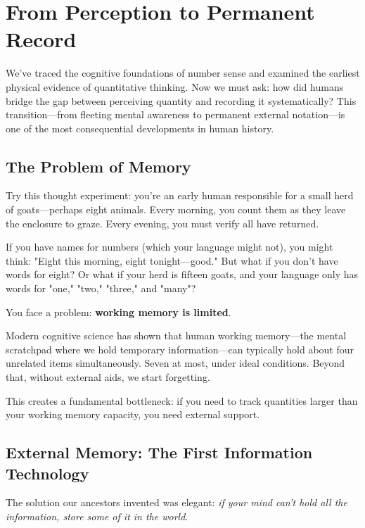 \section{From Perception to Permanent Record}
\label{sec:perception-to-record}

\begin{sectionintro}
	We've traced the cognitive foundations of number sense and examined the earliest physical evidence of quantitative thinking. Now we must ask: how did humans bridge the gap between perceiving quantity and recording it systematically? This transition—from fleeting mental awareness to permanent external notation—is one of the most consequential developments in human history.
\end{sectionintro}

\subsection{The Problem of Memory}

Try this thought experiment: you're an early human responsible for a small herd of goats—perhaps eight animals. Every morning, you count them as they leave the enclosure to graze. Every evening, you must verify all have returned.

If you have names for numbers (which your language might not), you might think: "Eight this morning, eight tonight—good." But what if you don't have words for eight? Or what if your herd is fifteen goats, and your language only has words for "one," "two," "three," and "many"?

You face a problem: \textbf{working memory is limited}.

Modern cognitive science has shown that human working memory—the mental scratchpad where we hold temporary information—can typically hold about four unrelated items simultaneously. Seven at most, under ideal conditions. Beyond that, without external aids, we start forgetting.

This creates a fundamental bottleneck: if you need to track quantities larger than your working memory capacity, you need external support.

\subsection{External Memory: The First Information Technology}

The solution our ancestors invented was elegant: \textit{if your mind can't hold all the information, store some of it in the world}.


